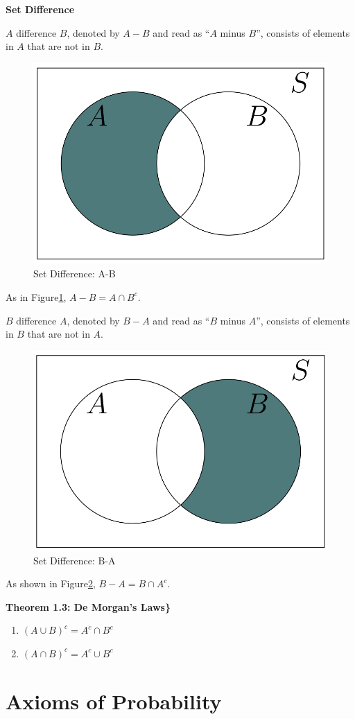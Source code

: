 \documentclass[
  12pt,
]{krantzNoCorner}
\providecommand{\tightlist}{%
  \setlength{\itemsep}{0pt}\setlength{\parskip}{0pt}}
\begin{document}
\textbf{Set Difference}

\(A\) difference \(B\), denoted by \(A-B\) and read as ``\(A\) minus \(B\)'',
consists of elements in \(A\) that are not in \(B\).

\begin{figure}
\includegraphics[width=0.5\linewidth,height=0.4\textheight]{Ven5} \caption{Set Difference: A-B}\label{fig:AminB}
\end{figure}

As in Figure\texttt{\ref{fig:AminB}}, \(A-B=A \cap B^c.\)

\(B\) difference \(A\), denoted by \(B-A\) and read as ``\(B\) minus \(A\)'',
consists of elements in \(B\) that are not in \(A\).

\begin{figure}
\includegraphics[width=0.5\linewidth,height=0.4\textheight]{Ven6} \caption{Set Difference: B-A}\label{fig:BminA}
\end{figure}

As shown in Figure\texttt{\ref{fig:BminA}}, \(B-A=B \cap A^c.\)

\textbf{Theorem 1.3: De Morgan's Laws\}}

\begin{enumerate}
\def\labelenumi{\arabic{enumi}.}
\tightlist
\item
  \((A\cup B)^c = A^c \cap B^c\)
\item
  \((A\cap B)^c = A^c \cup B^c\)
\end{enumerate}

\hypertarget{axioms-of-probability}{%
\section{Axioms of Probability}\label{axioms-of-probability}}
\end{document}
